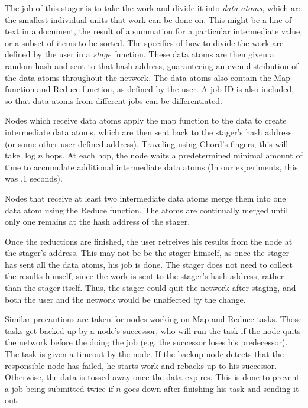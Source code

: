 \documentclass[conference, compsocconf, letterpaper]{IEEEtran}
\begin{document}
The job of this stager is to take the work and divide it into \emph{data atoms}, which are the smallest individual units that work can be done on.  This might be a line of text in a document, the result of a summation for a particular intermediate value, or a subset of items to be sorted.  The specifics of how to divide the work are defined by the user in a \emph{stage} function.  These data atoms are then given a random hash and sent to that hash address, guaranteeing an even distribution of the data atoms throughout the network.  The data atoms also contain the Map function and Reduce function, as defined by the user.  A job ID is also included, so that data atoms from different jobs can be differentiated.

Nodes which receive data atoms apply the map function to the data to create intermediate data atoms, which are then sent back to the stager's hash address (or some other user defined address).  Traveling using Chord's fingers, this will take $\log n$ hops.  At each hop, the node waits a predetermined minimal amount of time to accumulate additional intermediate data atoms (In our experiments, this was .1 seconds).%

Nodes that receive at least two intermediate data atoms merge them into one data atom using the Reduce function.   The atoms are continually merged until only one remains at the hash address of the stager. 

Once the reductions are finished, the user retreives his results from the node at the stager's address.  This may not be be the stager himself, as once the stager has sent all the data atoms, his job is done.  The stager does not need to collect the results himself, since the work is sent to the stager's hash address, rather than the stager itself.  Thus, the stager could quit the network after staging, and both the user and the network would be unaffected by the change. %

Similar precautions are taken for nodes working on Map and Reduce tasks.  Those tasks get backed up by a node's successor, who will run the task if the node quits the network before the doing the job (e.g. the successor loses his predecessor).   The task is given a timeout by the node.  If the backup node detects that the responsible node has failed, he starts work and rebacks up to his successor.  Otherwise, the data is tossed away once the data expires. This is done to prevent a job being submitted twice if $n$ goes down after finishing his task and sending it out.
\end{document}
